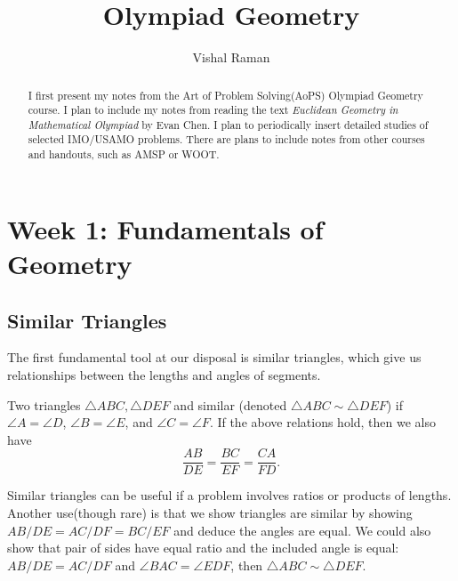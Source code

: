 \documentclass[12pt]{scrartcl}
\newcommand{\<}{\langle}
\renewcommand{\>}{\rangle}
\begin{document}
\title{Olympiad Geometry}
\author{Vishal Raman}
\maketitle
\begin{abstract}
I first present my notes from the Art of Problem Solving(AoPS) Olympiad Geometry course.  I plan to include my notes from reading the text \textit{Euclidean Geometry in Mathematical Olympiad} by Evan Chen.  I plan to periodically insert detailed studies of selected IMO/USAMO problems.  There are plans to include notes from other courses and handouts, such as AMSP or WOOT.
\end{abstract}
\tableofcontents
\pagebreak
\section{Week 1: Fundamentals of Geometry}
\subsection{Similar Triangles}
The first fundamental tool at our disposal is similar triangles, which give us relationships between the lengths and angles of segments.  \begin{definition} Two triangles $\triangle ABC, \triangle DEF$ and similar (denoted $\triangle ABC \sim \triangle DEF$) if $\angle A = \angle D$, $\angle B = \angle E$, and $\angle C = \angle F$.  If the above relations hold, then we also have
$$\frac{AB}{DE} = \frac{BC}{EF} = \frac{CA}{FD}.$$
\end{definition}

Similar triangles can be useful if a problem involves ratios or products of lengths.  Another use(though rare) is that we show triangles are similar by showing $AB/DE = AC/DF = BC/EF$ and deduce the angles are equal.  We could also show that pair of sides have equal ratio and the included angle is equal: $AB/DE = AC/DF$ and $\angle BAC = \angle EDF$, then $\triangle ABC \sim \triangle DEF$.
\end{document}
